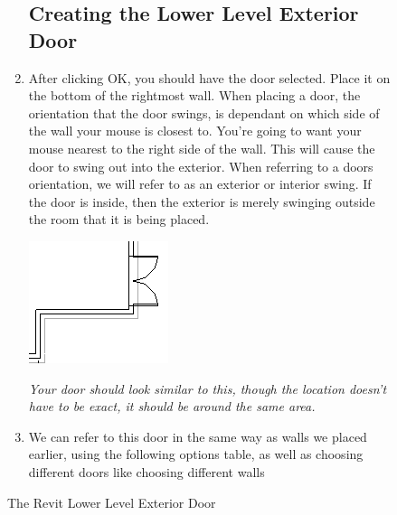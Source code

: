\documentclass{tufte-book} %
\begin{document}
\begin{figure}
\begin{enumerate}
	\subsection{Creating the Lower Level Exterior Door}
		\item After clicking OK, you should have the door selected. Place it on the bottom of the rightmost wall. When placing a door, the orientation that the door swings, is dependant on which side of the wall your mouse is closest to. You're going to want your mouse nearest to the right side of the wall. This will cause the door to swing out into the exterior. When referring to a doors orientation, we will refer to as an exterior or interior swing. If the door is inside, then the exterior is merely swinging outside the room that it is being placed.

		\begin{marginfigure}
			\includegraphics[width=\linewidth]{revitlowerexteriordoor.png}
			\caption{The Revit Lower Level Exterior Door}
			\emph{Your door should look similar to this, though the location doesn't have to be exact, it should be around the same area.}
			\label{fig:revlowerouterdoor}
		\end{marginfigure}

		\item We can refer to this door in the same way as walls we placed earlier, using the following options table, as well as choosing different doors like choosing different walls
		

\end{enumerate}
\end{figure}
\end{document}
